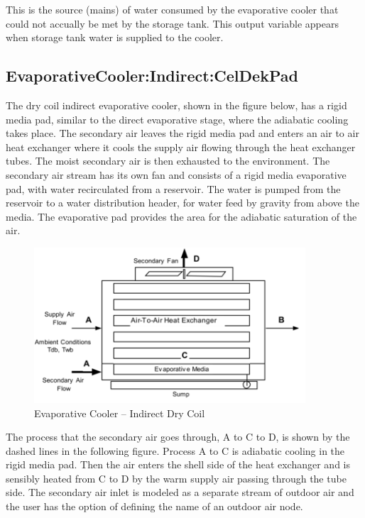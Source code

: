 This is the source (mains) of water consumed by the evaporative cooler that could not accually be met by the storage tank. This output variable appears when storage tank water is supplied to the cooler.

\subsection{EvaporativeCooler:Indirect:CelDekPad}\label{evaporativecoolerindirectceldekpad}

The dry coil indirect evaporative cooler, shown in the figure below, has a rigid media pad, similar to the direct evaporative stage, where the adiabatic cooling takes place. The secondary air leaves the rigid media pad and enters an air to air heat exchanger where it cools the supply air flowing through the heat exchanger tubes. The moist secondary air is then exhausted to the environment. The secondary air stream has its own fan and consists of a rigid media evaporative pad, with water recirculated from a reservoir. The water is pumped from the reservoir to a water distribution header, for water feed by gravity from above the media. The evaporative pad provides the area for the adiabatic saturation of the air.

\begin{figure}[hbtp] %
\centering
\includegraphics[width=0.9\textwidth, height=0.9\textheight, keepaspectratio=true]{media/image419.png}
\caption{Evaporative Cooler -- Indirect Dry Coil \protect \label{fig:evaporative-cooler-indirect-dry-coil}}
\end{figure}

The process that the secondary air goes through, A to C to D, is shown by the dashed lines in the following figure. Process A to C is adiabatic cooling in the rigid media pad. Then the air enters the shell side of the heat exchanger and is sensibly heated from C to D by the warm supply air passing through the tube side. The secondary air inlet is modeled as a separate stream of outdoor air and the user has the option of defining the name of an outdoor air node.

